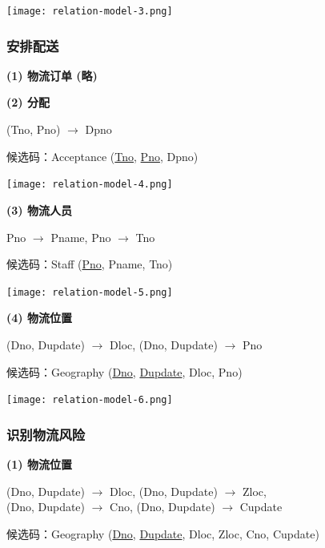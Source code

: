 \documentclass[12pt]{article}
\begin{document}
\begin{center}
	\texttt{[image: relation-model-3.png]}
\end{center}

\subsubsection{安排配送}

\noindent \textbf{(1) 物流订单 (略)} \par 

\noindent \textbf{(2) 分配} \par 
\noindent (Tno, Pno) $\rightarrow$ Dpno \par
\noindent 候选码：Acceptance (\uline{Tno}, \uline{Pno}, Dpno)

\begin{center}
	\texttt{[image: relation-model-4.png]}
\end{center}

\noindent \textbf{(3) 物流人员} \par 
\noindent Pno $\rightarrow$ Pname, Pno $\rightarrow$ Tno \par
\noindent 候选码：Staff (\uline{Pno}, Pname, Tno)

\begin{center}
	\texttt{[image: relation-model-5.png]}
\end{center}

\noindent \textbf{(4) 物流位置} \par 
\noindent (Dno, Dupdate) $\rightarrow$ Dloc, (Dno, Dupdate) $\rightarrow$ Pno \par
\noindent 候选码：Geography (\uline{Dno}, \uline{Dupdate}, Dloc, Pno)

\begin{center}
	\texttt{[image: relation-model-6.png]}
\end{center}

\subsubsection{识别物流风险}

\noindent \textbf{(1) 物流位置} \par 
\noindent (Dno, Dupdate) $\rightarrow$ Dloc, (Dno, Dupdate) $\rightarrow$ Zloc,\\ 
\noindent (Dno, Dupdate) $\rightarrow$ Cno, (Dno, Dupdate) $\rightarrow$ Cupdate \par
\noindent 候选码：Geography (\uline{Dno}, \uline{Dupdate}, Dloc, Zloc, Cno, Cupdate)
\end{document}
